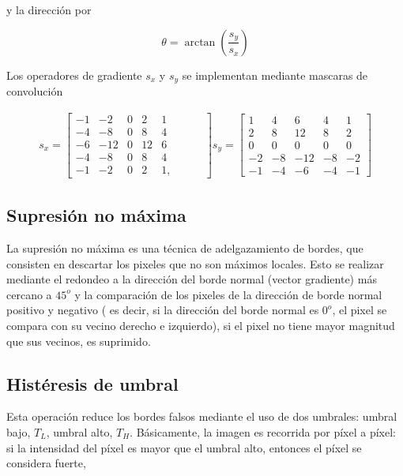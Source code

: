 y la dirección por

\begin{equation}
\theta = \arctan\left({\frac{s_{y}}{s_{x}}}\right)
\end{equation} 

Los operadores de gradiente $s_{x}$ y $s_{y}$ se implementan mediante mascaras de convolución 

\begin{equation}
\begin{array}{cclcccl}
s_{x} =\begin{bmatrix}
-1 & -2 & 0 & 2 & 1 \\ 
-4 & -8 & 0 & 8 & 4 \\ 
-6 & -12 & 0 & 12 & 6 \\ 
-4 & -8 & 0 & 8 & 4 \\ 
-1 & -2 & 0 & 2 & 1, &\hspace{1em}&
\end{bmatrix}
s_{y} =\begin{bmatrix}
1 & 4 & 6 & 4 & 1 \\ 
2 & 8 & 12 & 8 & 2 \\ 
0 & 0 & 0 & 0 & 0 \\ 
-2 & -8 & -12 & -8 & -2\\ 
-1 & -4 & -6 & -4 & -1
\end{bmatrix} 
\end{array}
\end{equation}

\subsection{Supresión no máxima}

La supresión no máxima es una técnica de adelgazamiento de bordes, que consisten en descartar los pixeles que no son máximos locales. Esto se realizar mediante el redondeo a la dirección del borde normal (vector gradiente) más cercano a $45^{o}$ y la comparación de los pixeles de la dirección de borde normal positivo y negativo ( es decir, si la dirección del borde normal es $0^{o}$, el pixel se compara con su vecino derecho e izquierdo), si el pixel no tiene mayor magnitud que sus vecinos, es suprimido.


\subsection{Histéresis de umbral}

Esta operación reduce los bordes falsos mediante el uso de dos umbrales: umbral bajo, $T_L$, umbral alto, $T_H$. Básicamente, la imagen es recorrida por píxel a píxel: si la intensidad del píxel es mayor que el umbral alto, entonces el píxel se considera fuerte,

